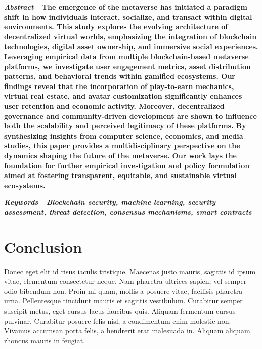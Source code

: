 \documentclass[a4paper]{article}
\begin{document}
\begin{multicols}{2}
\setlength{\columnsep}{0.5cm}


\noindent \textbf{\textit{Abstract---}The emergence of the metaverse has initiated a paradigm shift in how individuals interact, socialize, and transact within digital environments. This study explores the evolving architecture of decentralized virtual worlds, emphasizing the integration of blockchain technologies, digital asset ownership, and immersive social experiences. Leveraging empirical data from multiple blockchain-based metaverse platforms, we investigate user engagement metrics, asset distribution patterns, and behavioral trends within gamified ecosystems. Our findings reveal that the incorporation of play-to-earn mechanics, virtual real estate, and avatar customization significantly enhances user retention and economic activity. Moreover, decentralized governance and community-driven development are shown to influence both the scalability and perceived legitimacy of these platforms. By synthesizing insights from computer science, economics, and media studies, this paper provides a multidisciplinary perspective on the dynamics shaping the future of the metaverse. Our work lays the foundation for further empirical investigation and policy formulation aimed at fostering transparent, equitable, and sustainable virtual ecosystems.
}

\small	
\noindent \textbf{\textit{Keywords---}\textit{Blockchain security, machine learning, security assessment, threat detection, consensus mechanisms, smart contracts}}








\section{Conclusion}
Donec eget elit id risus iaculis tristique. Maecenas justo mauris, sagittis id ipsum vitae, elementum consectetur neque. Nam pharetra ultrices sapien, vel semper odio bibendum non. Proin mi quam, mollis a posuere vitae, facilisis pharetra urna. Pellentesque tincidunt mauris et sagittis vestibulum. Curabitur semper suscipit metus, eget cursus lacus faucibus quis. Aliquam fermentum cursus pulvinar. Curabitur posuere felis nisl, a condimentum enim molestie non. Vivamus accumsan porta felis, a hendrerit erat malesuada in. Aliquam aliquam rhoncus mauris in feugiat.


\end{multicols}
\end{document}
